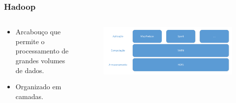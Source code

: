 \documentclass{beamer}
\begin{document}
\begin{frame}
 \frametitle{Hadoop}
 \begin{columns}[T] %
  \begin{column}{.40\textwidth}
  \begin{itemize}
  \item Arcabouço que permite o processamento de grandes volumes de dados.
  \item Organizado em camadas.
  \end{itemize}
  \end{column}%
  \hfill%
  \begin{column}{.56\textwidth}
  \begin{figure}[H]
  \centerline{\includegraphics[width=1\textwidth]{./img/hadoop-layers.pdf}}
  \label{fig:hadoop}
  \end{figure}
  \end{column}%
  \end{columns}
\end{frame}
\end{document}
